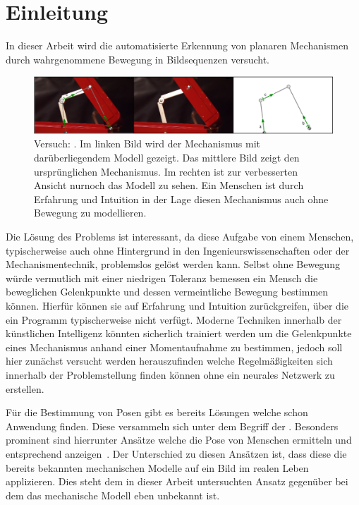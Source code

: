 %

\chapter{Einleitung}
\label{ch:einleitung}

In dieser Arbeit wird die automatisierte Erkennung von planaren Mechanismen durch wahrgenommene Bewegung in Bildsequenzen versucht.

\begin{figure}
\centering
    \includegraphics[width=\textwidth]{gfx/werkzeugkoffer_impl.png}
    \caption{Versuch: . Im linken Bild wird der Mechanismus mit darüberliegendem  Modell gezeigt. Das mittlere Bild zeigt den ursprünglichen Mechanismus. Im rechten ist zur verbesserten Ansicht nurnoch das  Modell zu sehen. Ein Menschen ist durch Erfahrung und Intuition in der Lage diesen Mechanismus auch ohne Bewegung zu modellieren.}\label{fig:werkzeugkoffer_impl}
\end{figure}

Die Lösung des Problems ist interessant, da diese Aufgabe von einem Menschen, typischerweise auch ohne Hintergrund in den Ingenieurswissenschaften oder der Mechanismentechnik, problemslos gelöst werden kann.
Selbst ohne Bewegung würde vermutlich mit einer niedrigen Toleranz bemessen ein Mensch die beweglichen Gelenkpunkte und dessen vermeintliche Bewegung bestimmen können.
Hierfür können sie auf Erfahrung und Intuition zurückgreifen, über die ein Programm typischerweise nicht verfügt.
Moderne Techniken innerhalb der künstlichen Intelligenz könnten sicherlich trainiert werden um die Gelenkpunkte eines Mechanismus anhand einer Momentaufnahme zu bestimmen, jedoch soll hier zunächst versucht werden herauszufinden welche Regelmäßigkeiten sich innerhalb der Problemstellung finden können ohne ein neurales Netzwerk zu erstellen.

Für die Bestimmung von Posen gibt es bereits Lösungen welche schon Anwendung finden.
Diese versammeln sich unter dem Begriff der .
Besonders prominent sind hierrunter Ansätze welche die Pose von Menschen ermitteln und entsprechend anzeigen~\cite{Papandreou2018, Google2021, Google2021a}.
Der Unterschied zu diesen Ansätzen ist, dass diese die bereits bekannten mechanischen Modelle auf ein Bild im realen Leben applizieren.
Dies steht dem in dieser Arbeit untersuchten Ansatz gegenüber bei dem das mechanische Modell eben unbekannt ist.

